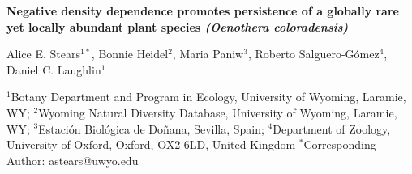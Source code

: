 \documentclass[12pt, letterpaper]{article}
\begin{document}
\begin{flushleft}
\textbf{Negative density dependence promotes persistence of a globally rare yet locally abundant plant species \textit{(Oenothera coloradensis)}}

\normalsize{Alice E. Stears$^{1*}$, Bonnie Heidel$^2$, Maria Paniw$^3$, Roberto Salguero-Gómez$^4$, Daniel C. Laughlin$^1$}

\small{$^1$Botany Department and Program in Ecology, University of Wyoming, Laramie, WY; \linebreak
$^2$Wyoming Natural Diversity Database, University of Wyoming, Laramie, WY; \linebreak
$^3$Estación Biológica de Doñana, Sevilla, Spain; \linebreak
$^4$Department of Zoology, University of Oxford, Oxford, OX2 6LD, United Kingdom}\linebreak
\small{$^*$Corresponding Author: astears@uwyo.edu}





\end{flushleft}
\end{document}
